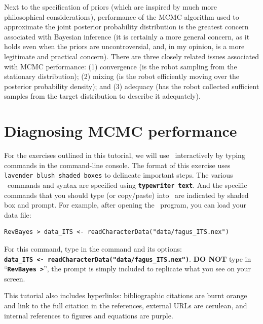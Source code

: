 \documentclass[11pt]{article}
\newcommand{\cl}[1]{{\texttt{\textbf{#1}}}}
\begin{document}
Next to the specification of priors (which are inspired by much more philosophical considerations), performance of the MCMC algorithm used to approximate the joint posterior probability distribution is the greatest concern associated with Bayesian inference (it is certainly a more general concern, as it holds even when the priors are uncontroversial, and, in my opinion, is a more legitimate and practical concern). 
There are three closely related issues associated with MCMC performance: (1) convergence (is the robot sampling from the stationary distribution); (2) mixing (is the robot efficiently moving over the posterior probability density); and (3) adequacy (has the robot collected sufficient samples from the target distribution to describe it adequately).


\bigskip
\section{Diagnosing MCMC performance}

For the exercises outlined in this tutorial, we will use \RevBayes~interactively by typing commands in the command-line console.
The format of this exercise uses \colorbox{shadecolor}{\tt lavender blush shaded boxes} to delineate important steps. 
The various \RevBayes~commands and syntax are specified using \cl{typewriter text}. 
And the specific commands that you should type (or copy/paste) into \RevBayes~are indicated by shaded box and prompt. 
For example, after opening the \RevBayes~program, you can load your data file:

{\tt \begin{snugshade*}
\begin{lstlisting}
RevBayes > data_ITS <- readCharacterData("data/fagus_ITS.nex")
\end{lstlisting}
\end{snugshade*}}

For this command, type in the command and its options:\\ \cl{data\_ITS <- readCharacterData("data/fagus\_ITS.nex")}. 
\textbf{DO NOT} type in ``\cl{RevBayes >}'', the prompt is simply included to replicate what you see on your screen. 

This tutorial also includes hyperlinks: bibliographic citations are {\textcolor{citescol}{burnt orange}} and link to the full citation in the references, external URLs are {\textcolor{urlscol}{cerulean}}, and internal references to figures and equations are {\textcolor{linkscol}{purple}}.
\end{document}
